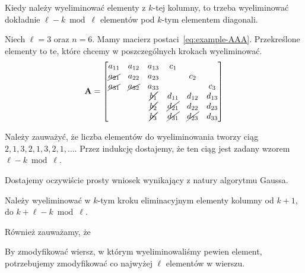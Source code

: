 \documentclass[../analysis.tex]{subfiles}
\newcommand{\AAA}{\mathbf{A}}
\begin{document}
  \begin{observation}
    Kiedy należy wyeliminować elementy z \( k \)-tej kolumny,
    to trzeba wyeliminować dokładnie \( \ell - k \bmod \ell \)
    elementów pod \( k \)-tym elementem diagonali.
  \end{observation}
  \begin{example}
    Niech \( \ell = 3 \) oraz \( n = 6 \). Mamy macierz 
    postaci~\ref{eq:example-AAA}. Przekreślone elementy
    to te, które chcemy w poszczególnych krokach wyeliminować.
    \begin{equation} \label{eq:example-AAA}
      \AAA = \begin{bmatrix}
        a_{11}            & a_{12}          & a_{13}          & c_{1}           &                 &        \\
        \cancel{a_{21}}   & a_{22}          & a_{23}          &                 & c_{2}           &        \\
        \cancel{a_{31}}   & \cancel{a_{32}} & a_{33}          &                 &                 & c_{3}  \\
                          &                 & \cancel{b_{1}}  & d_{11}          & d_{12}          & d_{13} \\
                          &                 & \cancel{b_{2}}  & \cancel{d_{21}} & d_{22}          & d_{23} \\
                          &                 & \cancel{b_{3}}  & \cancel{d_{31}} & \cancel{d_{23}} & d_{33} 
      \end{bmatrix}
    \end{equation}

    Należy zauważyć, że liczba elementów do wyeliminowania tworzy ciąg \( 2, 1, 3, 2, 1, 3, 2, 1,
    \dotsc \). Przez indukcję dostajemy, że ten ciąg jest zadany wzorem \( \ell - k \bmod \ell \).
  \end{example}
  Dostajemy oczywiście prosty wniosek wynikający z natury algorytmu Gaussa.
  \begin{corollary} \label{col:num-steps}
    Należy wyeliminować w \( k \)-tym kroku eliminacyjnym
    elementy kolumny od \( k + 1 \), do \( k + \ell - k \bmod \ell \).
  \end{corollary}
  Również zauważamy, że
  \begin{observation} 
    By zmodyfikować wiersz, w którym wyeliminowaliśmy pewien element,
    potrzebujemy zmodyfikować co najwyżej \( \ell \) elementów 
    w wierszu.
  \end{observation}
\end{document}
